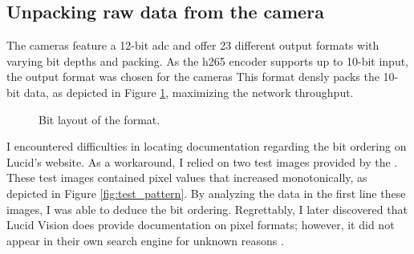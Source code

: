 \subsection {Unpacking raw data from the camera}
\label{sec:unpacking}


The \lucid cameras feature a 12-bit \gls{adc} and offer 23 different output formats with varying bit depths and packing.
As the \gls{h265} encoder supports up to 10-bit input, the  output format was chosen for the cameras \cite[17 ]{nvidiaNVIDIAJetsonAGX2019}
This format densly packs the 10-bit data, as depicted in Figure \ref{fig:mono10p}, maximizing the network throughput.

\begin{figure}[H]
    \centering
    \caption{Bit layout of the  format.}
    \label{fig:mono10p}
\end{figure}


I encountered difficulties in locating documentation regarding the bit ordering on Lucid's website.
As a workaround, I relied on two test images provided by the \cam.
These test images contained pixel values that increased monotonically, as depicted in Figure \ref{fig:test_pattern}.
By analyzing the data in the first line these images, I was able to deduce the bit ordering.
Regrettably, I later discovered that Lucid Vision does provide documentation on pixel formats; however, it did not appear in their own search engine for unknown reasons \cite{lucidvisionlabsPixelFormatsLUCID2020}.

